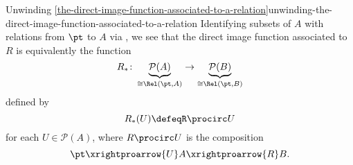 \begin{remark}{Unwinding \cref{the-direct-image-function-associated-to-a-relation}}{unwinding-the-direct-image-function-associated-to-a-relation}%
    Identifying subsets of $A$ with relations from $\pt$ to $A$ via , we see that the direct image function associated to $R$ is equivalently the function
    \[
        R_{*}%
        \colon%
        \underbrace{\mathcal{P}(A)}_{\cong\Rel(\pt,A)}
        \to%
        \underbrace{\mathcal{P}(B)}_{\cong\Rel(\pt,B)}%
    \]%
    defined by
    \[
        R_{*}(U)%
        \defeq%
        R\procirc U%
    \]%
    for each $U\in\mathcal{P}(A)$, where $R\procirc U$ is the composition
    \[
        \pt%
        \xrightproarrow{U}%
        A%
        \xrightproarrow{R}%
        B.
    \]%
\end{remark}
